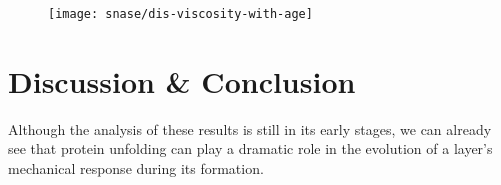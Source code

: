    \begin{figure}
    \centering
    \texttt{[image: snase/dis-viscosity-with-age]}
    \caption{\label{fig:dis-viscosity-with-age}}
    \end{figure}


\section{Discussion \& Conclusion}

Although the analysis of these results is still in its early stages, we can already see that protein unfolding can play a dramatic role in the evolution of a layer's mechanical response during its formation.
